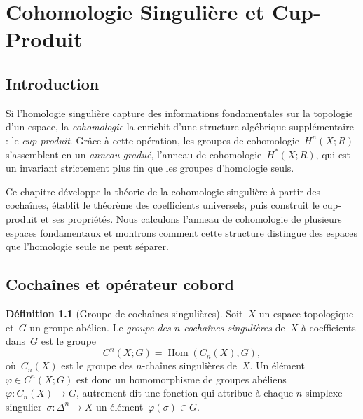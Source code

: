 \documentclass[12pt,a4paper,openany]{book}
\theoremstyle{definition}
\newtheorem{definition}{Définition}[chapter]
\theoremstyle{plain}
\theoremstyle{remark}
\DeclareMathOperator{\Hom}{Hom}
\begin{document}
\newpage

\chapter{Cohomologie Singulière et Cup-Produit}\label{ch:cohomologie}

\section*{Introduction}

Si l'homologie singulière capture des informations fondamentales sur la topologie d'un
espace, la \emph{cohomologie} la enrichit d'une structure algébrique supplémentaire :
le \emph{cup-produit}. Grâce à cette opération, les groupes de
cohomologie~$H^n(X; R)$ s'assemblent en un \emph{anneau gradué}, l'anneau de
cohomologie~$H^*(X; R)$, qui est un invariant strictement plus fin que les groupes
d'homologie seuls.

Ce chapitre développe la théorie de la cohomologie singulière à partir des cochaînes,
établit le théorème des coefficients universels, puis construit le cup-produit et ses
propriétés. Nous calculons l'anneau de cohomologie de plusieurs espaces fondamentaux et
montrons comment cette structure distingue des espaces que l'homologie seule ne peut
séparer.

\section{Cochaînes et opérateur cobord}\label{sec:cochaines}

\begin{definition}[Groupe de cochaînes singulières]\label{def:cochaines}
Soit~$X$ un espace topologique et~$G$ un groupe abélien. Le \emph{groupe des $n$-cochaînes
singulières} de~$X$ à coefficients dans~$G$ est le groupe
\[
  C^n(X; G) = \Hom(C_n(X), G),
\]
où~$C_n(X)$ est le groupe des $n$-chaînes singulières de~$X$.
Un élément~$\varphi \in C^n(X; G)$ est donc un homomorphisme de groupes abéliens
$\varphi \colon C_n(X) \to G$, autrement dit une fonction qui attribue à chaque
$n$-simplexe singulier~$\sigma \colon \Delta^n \to X$ un élément~$\varphi(\sigma) \in G$.
\end{definition}
\end{document}
